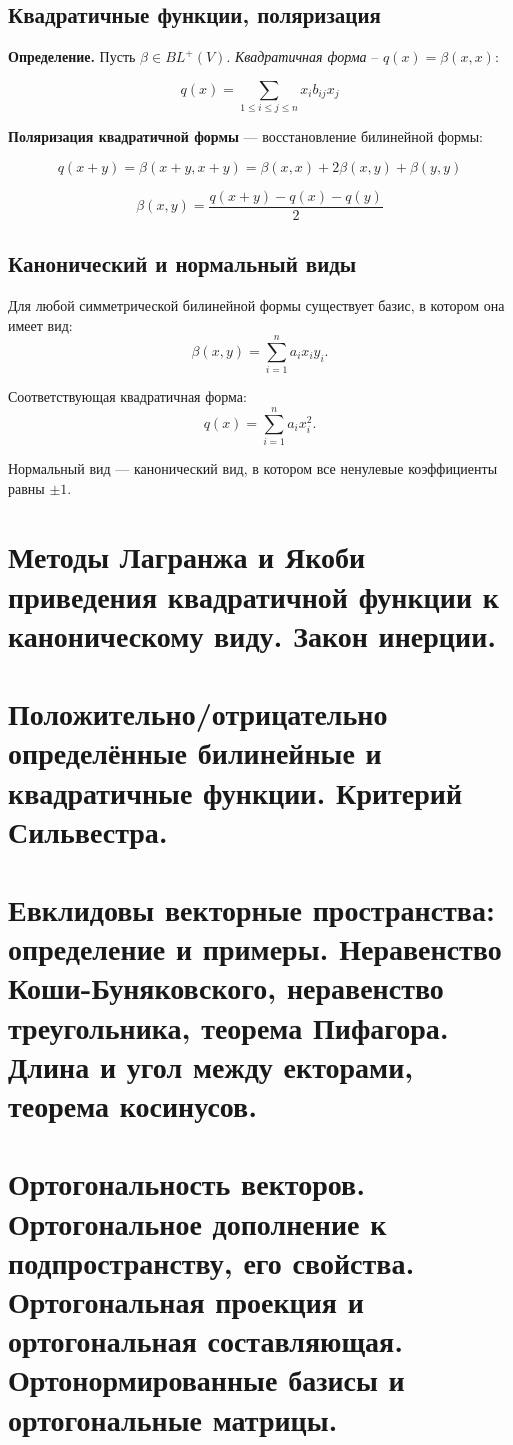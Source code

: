 \documentclass[12pt]{article}
\begin{document}
\subsection{Квадратичные функции, поляризация}

\textbf{Определение.} Пусть $\beta \in BL^+(V).$ \textit{Квадратичная форма} – $q(x)=\beta(x,x)$:

$$
q(x) =\sum_{1 \leq i \leq j \leq n}{x_i b_{ij}x_j}
$$

\textbf{Поляризация квадратичной формы} — восстановление билинейной формы:

$$
q(x + y) = \beta(x + y, x + y)
         = \beta(x, x) + 2\beta(x, y) + \beta(y, y)
$$

$$
\beta(x, y) = \frac{q(x + y) - q(x) - q(y)}{2}
$$

\subsection{Канонический и нормальный виды}

Для любой симметрической билинейной формы существует базис, в котором она имеет вид:
$$
\beta(x, y) = \sum_{i=1}^n a_i x_i y_i.
$$

Соответствующая квадратичная форма:
$$
q(x) = \sum_{i=1}^n a_i x_i^2.
$$

Нормальный вид — канонический вид, в котором все ненулевые коэффициенты равны $\pm 1$.

\section{Методы Лагранжа и Якоби приведения квадратичной функции к каноническому виду. Закон инерции.}

\section{Положительно/отрицательно определённые билинейные и квадратичные функции. Критерий Сильвестра.}

\section{Евклидовы векторные пространства: определение и примеры. Неравенство Коши-Буняковского, неравенство треугольника, теорема Пифагора. Длина и угол между екторами, теорема косинусов.}

\section{Ортогональность векторов. Ортогональное дополнение к подпространству, его свойства. Ортогональная проекция и ортогональная составляющая. Ортонормированные базисы и ортогональные матрицы.}
\end{document}
